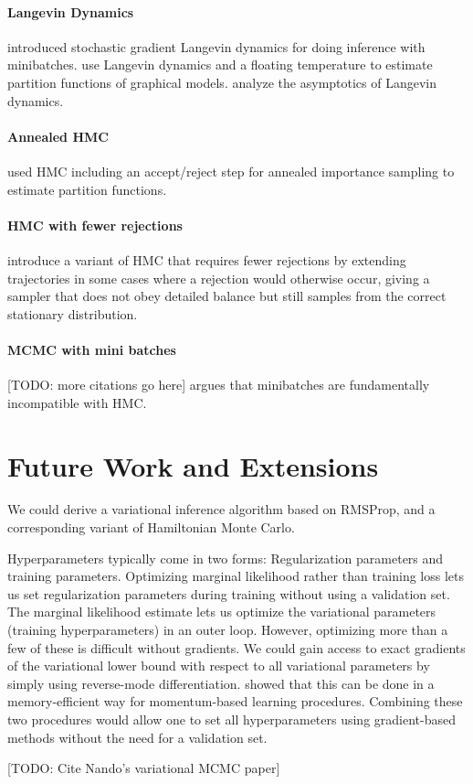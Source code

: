 \documentclass[]{article}
\begin{document}
\paragraph{Langevin Dynamics}
\citet{welling2011bayesian} introduced stochastic gradient Langevin dynamics for doing inference with minibatches.
\citet{ma2013estimating} use Langevin dynamics and a floating temperature to estimate partition functions of graphical models.
\citet{vollmer2015non} analyze the asymptotics of Langevin dynamics.

\paragraph{Annealed HMC}
\citet{sohl2012hamiltonian} used HMC including an accept/reject step for annealed importance sampling to estimate partition functions.

\paragraph{HMC with fewer rejections}
\citet{sohl2014hamiltonian} introduce a variant of HMC that requires fewer rejections by extending trajectories in some cases where a rejection would otherwise occur, giving a sampler that does not obey detailed balance but still samples from the correct stationary distribution.

\paragraph{MCMC with mini batches}
[TODO: more citations go here]
\citet{betancourt2015fundamental} argues that minibatches are fundamentally incompatible with HMC.


\section{Future Work and Extensions}

We could derive a variational inference algorithm based on RMSProp, and a corresponding variant of Hamiltonian Monte Carlo.

Hyperparameters typically come in two forms:
Regularization parameters and training parameters.
Optimizing marginal likelihood rather than training loss lets us set regularization parameters during training without using a validation set.
The marginal likelihood estimate lets us optimize the variational parameters (training hyperparameters) in an outer loop.
However, optimizing more than a few of these is difficult without gradients.
We could gain access to exact gradients of the variational lower bound with respect to all variational parameters by simply using reverse-mode differentiation.
\citet{MacDuvAda2015hyper} showed that this can be done in a memory-efficient way for momentum-based learning procedures.
Combining these two procedures would allow one to set all hyperparameters using gradient-based methods without the need for a validation set.



[TODO: Cite Nando's variational MCMC paper]




\end{document}

